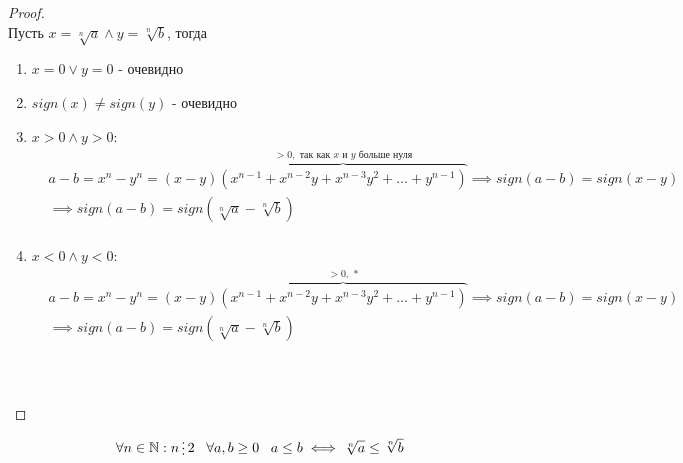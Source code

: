\begin{proof}
    \hfill \\

    Пусть $x = \sqrt[n]{a} \land y = \sqrt[n]{b}$, тогда
    \begin{enumerate}
        \item $x = 0 \lor y = 0$ - очевидно
        \item $sign(x) \neq sign(y)$ - очевидно
        \item $x > 0 \land y > 0$:
        \begin{align*}
            &a-b = x^n - y^n = (x-y)\overbrace{(x^{n-1} + x^{n-2}y + x^{n-3}y^2 + \dots + y^{n-1})}^{> 0, \text{ так как } x \text{ и } y \text{ больше нуля}}
            \implies sign(a-b) = sign(x-y) \\
            &\implies sign(a-b) = sign(\sqrt[n]{a} - \sqrt[n]{b}) \\
        \end{align*}
        \item $x < 0 \land y < 0$:
        \begin{align*}
            &a-b = x^n - y^n = (x-y)\overbrace{(x^{n-1} + x^{n-2}y + x^{n-3}y^2 + \dots + y^{n-1})}^{> 0, \text{ *}}
            \implies sign(a-b) = sign(x-y) \\
            &\implies sign(a-b) = sign(\sqrt[n]{a} - \sqrt[n]{b}) \\
        \end{align*}
         \\
         \\
    \end{enumerate}
\end{proof}

\begin{theorem}
    \begin{align*}
        \forall n \in \mathbb{N}: n \divisible 2 \;\;\; \forall a,b \ge 0 \;\;\; a \le b \iff \sqrt[n]{a} \le \sqrt[n]{b}
    \end{align*}
\end{theorem}

